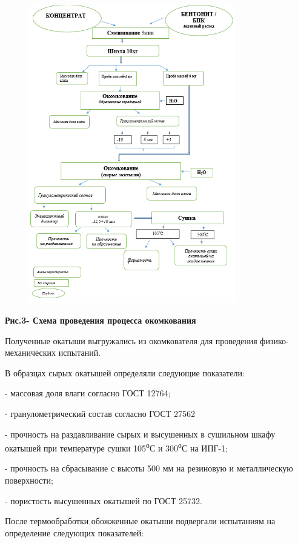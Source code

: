 \begin{figure}[H]
	\centering
	\includegraphics[width=0.8\textwidth]{media/chem2/image64}
	\caption*{}
\end{figure}


{\bfseries Рис.3- Схема проведения процесса окомкования}

Полученные окатыши выгружались из окомкователя для проведения
физико-механических испытаний.

В образцах сырых окатышей определяли следующие показатели:

- массовая доля влаги согласно ГОСТ 12764;

- гранулометрический состав согласно ГОСТ 27562

- прочность на раздавливание сырых и высушенных в сушильном шкафу
окатышей при температуре сушки 105\textsuperscript{о}С и
300\textsuperscript{о}С на ИПГ-1;

- прочность на сбрасывание с высоты 500 мм на резиновую и металлическую
поверхности;

- пористость высушенных окатышей по ГОСТ 25732.

После термообработки обожженные окатыши подвергали испытаниям на
определение следующих показателей:

